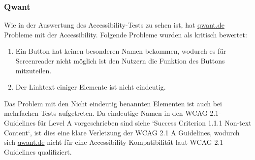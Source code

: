 \subsubsection{Qwant}\label{subsubsec:qwant}
Wie in der Auswertung des Accessibility-Tests zu sehen ist, hat \url{qwant.de} Probleme mit der Accessibility.
Folgende Probleme wurden als kritisch bewertet:
\begin{enumerate}
    \item Ein Button hat keinen besonderen Namen bekommen, wodurch es für Screenreader nicht möglich ist den Nutzern die Funktion des Buttons mitzuteilen.
    \item Der Linktext einiger Elemente ist nicht eindeutig.
\end{enumerate}
Das Problem mit den Nicht eindeutig benannten Elementen ist auch bei mehrfachen Tests aufgetreten.
Da eindeutige Namen in den WCAG 2.1-Guidelines für Level A vorgeschrieben sind siehe `Success Criterion 1.1.1 Non-text Content`\cite{WCAG21},
ist dies eine klare Verletzung der WCAG 2.1 A Guidelines, wodurch sich \url{qwant.de} nicht für eine Accessibility-Kompatibilität laut WCAG 2.1-Guidelines qualifiziert.